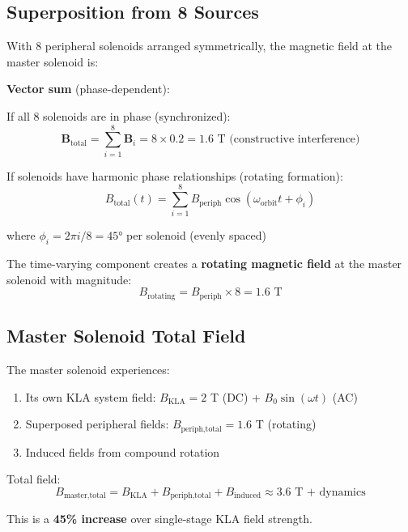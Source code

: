 \documentclass[12pt,a4paper]{article}
\begin{document}
\subsection{Superposition from 8 Sources}

With 8 peripheral solenoids arranged symmetrically, the magnetic field at the master solenoid is:

\textbf{Vector sum} (phase-dependent):

If all 8 solenoids are in phase (synchronized):
\begin{equation}
\mathbf{B}_{\text{total}} = \sum_{i=1}^{8} \mathbf{B}_i = 8 \times 0.2 = 1.6 \text{ T (constructive interference)}
\end{equation}

If solenoids have harmonic phase relationships (rotating formation):
\begin{equation}
B_{\text{total}}(t) = \sum_{i=1}^{8} B_{\text{periph}} \cos(\omega_{\text{orbit}} t + \phi_i)
\end{equation}

where $\phi_i = 2\pi i / 8 = 45°$ per solenoid (evenly spaced)

The time-varying component creates a \textbf{rotating magnetic field} at the master solenoid with magnitude:
\begin{equation}
B_{\text{rotating}} = B_{\text{periph}} \times 8 = 1.6 \text{ T}
\end{equation}

\subsection{Master Solenoid Total Field}

The master solenoid experiences:
\begin{enumerate}
\item Its own KLA system field: $B_{\text{KLA}} = 2$ T (DC) + $B_0 \sin(\omega t)$ (AC)
\item Superposed peripheral fields: $B_{\text{periph,total}} = 1.6$ T (rotating)
\item Induced fields from compound rotation
\end{enumerate}

Total field:
\begin{equation}
B_{\text{master,total}} = B_{\text{KLA}} + B_{\text{periph,total}} + B_{\text{induced}} \approx 3.6 \text{ T + dynamics}
\end{equation}

This is a \textbf{45\% increase} over single-stage KLA field strength.
\end{document}
